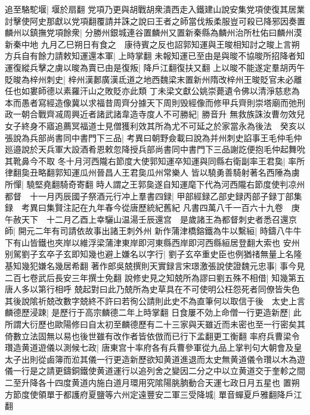 追至駱駝堰|{
	堰於扇翻}
党項乃更與胡戰胡衆潰西走入鐵建山說安集党項使復其居業討擊使阿史那獻以党項翻覆請并誅之說曰王者之師當伐叛柔服豈可殺已降邪因奏置麟州以鎮撫党項餘衆|{
	分勝州銀城連谷置麟州又置新秦縣為麟州治所杜佑曰麟州漠新秦中地}
九月乙巳朔日有食之　康待賓之反也詔郭知運與王晙相知討之晙上言朔方兵自有餘力請敕知運還本軍|{
	上時掌翻}
未報知運已至由是與晙不協晙所招降者知運復縱兵擊之虜以晙為賣已由是復叛|{
	降戶江翻復扶又翻}
上以晙不能遂定羣胡丙午貶晙為梓州刺史|{
	梓州漢郪廣漢氐道之地西魏梁末置新州隋改梓州王晙貶官未必離任也如婁師德以素羅汗山之敗貶亦此類}
丁未梁文獻公姚崇薨遺令佛以清淨慈悲為本而愚者寫經造像冀以求福昔周齊分據天下周則毁經像而修甲兵齊則崇塔廟而弛刑政一朝合戰齊㓕周興近者諸武諸韋造寺度人不可勝紀|{
	勝音升}
無救族誅汝曹勿效兒女子終身不寤追薦冥福道士見僧獲利效其所為尤不可延之於家當永為後法　癸亥以張說為兵部尚書同中書門下三品|{
	考異曰朝野僉載曰說為并州刺史諂事王毛仲毛仲廵邉說於天兵軍大設酒肴恩敕忽降授兵部尚書同中書門下三品謝訖便抱毛仲起舞吮其靴鼻今不取}
冬十月河西隴右節度大使郭知運卒知運與同縣右衛副率王君㚟|{
	率所律翻㚟丑略翻郭知運瓜州晉昌人王君㚟瓜州常樂人}
皆以驍勇善騎射著名西陲為虜所憚|{
	驍堅堯翻騎奇寄翻}
時人謂之王郭㚟遂自知運麾下代為河西隴右節度使判凉州都督　十一月丙辰國子祭酒元行冲上羣書四録|{
	甲部經録乙部史録丙部子録丁部集録　考異曰集賢注記在九年春今從唐歷統紀舊紀}
凡書四萬八千一百六十九卷　庚午赦天下　十二月乙酉上幸驪山温湯壬辰還宫　是歲諸王為都督刺史者悉召還京師|{
	開元二年有司請依故事出諸王刺外州}
新作蒲津橋鎔鐵為牛以繫絙|{
	時鑄八牛牛下有山皆鐵也夾岸以維浮梁蒲津東岸即河東縣西岸即河西縣絙居登翻大索也}
安州别駕劉子玄卒子玄即知幾也避上嫌名以字行|{
	劉子玄卒重史臣也例猶禇無量上名隆基知幾犯嫌名幾居希翻}
著作郎吳兢撰則天實録言宋璟激張說使證魏元忠事|{
	事今見二百七卷武后長安三年撰士免翻}
說修史見之知兢所為謬曰劉五殊不相借|{
	知幾第五唐人多以第行相呼}
兢起對曰此乃兢所為史草具在不可使明公枉怨死者同僚皆失色其後說隂祈兢改數字兢終不許曰若徇公請則此史不為直筆何以取信于後　太史上言麟德歷浸踈|{
	是歷行于高宗麟德二年上時掌翻}
日食屢不効上命僧一行更造新歷|{
	此所謂大衍歷也歐陽修曰自太初至麟德歷有二十三家與天雖近而未密也至一行密矣其倚數立法固無以易也後世雖有改作者皆依倣而已行下孟翻更工衡翻}
率府兵曹梁令瓚造黄道遊儀以測候七政|{
	唐東宫十率府各有兵曹參軍從九品上掌判句大朝會及皇太子出則從鹵簿而涖其儀一行更造新歷欲知黄道進退而太史無黄道儀令瓚以木為遊儀一行是之請更鑄銅鐵使黄道運行以追列舍之變因二分之中以立黄道交于奎軫之間二至升降各十四度黄道内施白道月環用究隂陽朓朒動合天運七政日月五星也}
置朔方節度使領單于都護府夏鹽等六州定遠豐安二軍三受降城|{
	單音蟬夏戶雅翻降戶江翻}


